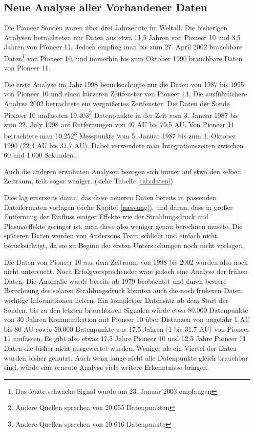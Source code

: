\subsection{Neue Analyse aller Vorhandener Daten}\label{daten}
Die Pioneer Sonden waren über drei Jahrzehnte im Weltall. Die bisherigen Analysen betrachteten nur Daten aus etwa 11,5 Jahren von Pioneer 10 und 3,5 Jahren von Pioneer 11. Jedoch empfing man bis zum 27. April 2002 brauchbare Daten\footnote{Das letzte schwache Signal wurde am 23. Januar 2003 empfangen} von Pioneer 10. und immerhin bis zum Oktober 1990 brauchbare Daten von Pioneer 11.

Die erste Analyse im Jahr 1998 berücksichtigte nur die Daten von 1987 bis 1995 von Pioneer 10 und einen kürzeren Zeitfenster von Pioneer 11. Die ausführlichere Analyse 2002 betrachtete ein vergrößertes Zeitfenster. Die Daten der Sonde Pioneer 10 umfassten 19.403\footnote{Andere Quellen sprechen von 20.055 Datenpunkten\cite{Turyshev2004}} Datenpunkte in der Zeit vom 3. Januar 1987 bis zum 22. July 1998 auf Entfernungen von 40 AU bis 70,5 AU. Von Pioneer 11 betrachtete man 10.252\footnote{Andere Quellen sprechen von 10.616 Datenpunkte\cite{Turyshev2004}} Messpunkte vom 5. Januar 1987 bis zum 1. Oktober 1990 (22,4 AU bis 31,7 AU).%
Dabei verwendete man Integrationszeiten zwischen 60 und 1.000 Sekunden.\cite{Turyshev2004}.

Auch die anderen erwähnten Analysen bezogen sich immer auf etwa den selben Zeitraum, teils sogar weniger. (siehe Tabelle \ref{tab:daten})

Dies lag einerseits daran, das diese neueren Daten bereits in passenden Dateiformaten vorlagen (siehe Kapitel \ref{messung}), und daran, dass in großer Entfernung der Einfluss einiger Effekte wie der Strahlungsdruck und Plasmaeffekte geringer ist, man diese also weniger genau berechnen musste.\cite{Nieto2005} Die späteren Daten wurden von Andersons Team schlicht und einfach nicht berücksichtigt, da sie zu Beginn der ersten Untersuchungen noch nicht vorlagen. %

Die Daten von Pioneer 10 aus dem Zeitraum von 1998 bis 2002 wurden also noch nicht untersucht.
Noch Erfolgversprechender wäre jedoch eine Analyse der frühen Daten. Die Anomalie wurde bereits ab 1979 beobachtet und durch bessere Berechnung des solaren Strahlungsdruck könnten auch die noch früheren Daten wichtige Informationen liefern.
Ein kompletter Datensatz ab dem Start der Sonden, bis zu den letzten brauchbaren Signalen würde etwa 80.000 Datenpunkte von 30 Jahren Kommunikation mit Pioneer 10  über Distanzen von ungefähr 1 AU bis 80 AU sowie 50.000 Datenpunkte aus 17.5 Jahren (1 bis 31,7 AU) von Pioneer 11 umfassen.\cite{Turyshev2004} Es gibt also etwas 17,5 Jahre Pioneer 10 und 12,5 Jahre Pioneer 11 Daten die bisher nicht ausgewertet wurden. Weniger als ein Viertel der Daten wurden bisher genutzt. Auch wenn lange nicht alle Datenpunkte gleich brauchbar sind, würde eine erneute Analyse viele weitere Erkenntnisse bringen.

